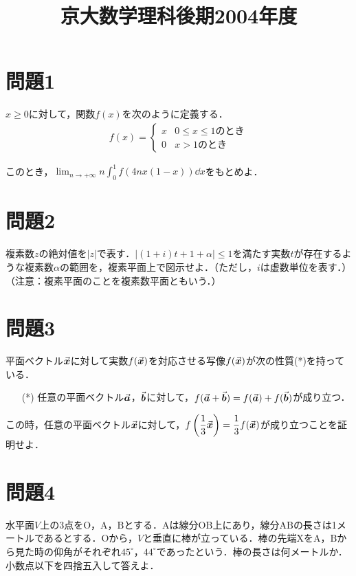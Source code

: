 \documentclass[unicode,12pt, A4j]{ltjsarticle}%
\title{京大数学理科後期2004年度}
\author{}
\date{}
\begin{document}
\maketitle

\section{問題1}
$x\ge 0$に対して，関数$f(x)$を次のように定義する．
\begin{align*}
 f(x)=
 \begin{cases}
  x & \text{$0\le x\le 1$のとき} \\
  0 & \text{$x>1$のとき} 
 \end{cases}
\end{align*}

このとき，${\displaystyle \lim_{n\to +\infty}n\int_0^1 f(4nx(1-x))\dd x }$をもとめよ．
	  
\section{問題2}
複素数$z$の絶対値を$|z|$で表す．$|(1+i)t+1+\alpha|\le 1$を満たす実数$t$が存在するような複素数$\alpha$の範囲を，複素平面上で図示せよ．（ただし，$i$は虚数単位を表す．）（注意：複素平面のことを複素数平面ともいう．）

\section{問題3}
平面ベクトル$\va*{x}$に対して実数$f(\va*{x})$を対応させる写像$f(\va*{x})$が次の性質(*)を持っている．
\begin{itemize}
 \item[(*)] 任意の平面ベクトル$\va*{a}$，$\va*{b}$に対して，$f(\va*{a}+\va*{b})=f(\va*{a})+f(\va*{b})$が成り立つ．
\end{itemize}
この時，任意の平面ベクトル$\va*{x}$に対して，$f\left(\dfrac{1}{3}\va*{x}\right)=\dfrac{1}{3}f(\va*{x})$が成り立つことを証明せよ．


\section{問題4}
水平面$V$上の$3$点を$\mathrm{O}$，$\mathrm{A}$，$\mathrm{B}$とする．$\mathrm{A}$は線分$\mathrm{OB}$上にあり，線分$\mathrm{AB}$の長さは1メートルであるとする．$\mathrm{O}$から，$V$と垂直に棒が立っている．棒の先端$\mathrm{X}$を$\mathrm{A}$，$\mathrm{B}$から見た時の仰角がそれぞれ$45^{\circ}$，$44^{\circ}$であったという．棒の長さは何メートルか．小数点以下を四捨五入して答えよ．
\end{document}
